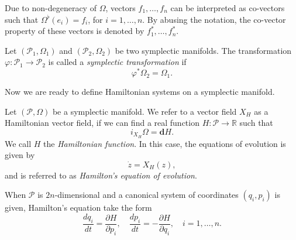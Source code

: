 Due to non-degeneracy of $\Omega$, vectors $f_1,\dots,f_n$ can be interpreted as co-vectors such that $\Omega^{\flat}(e_i)=f_i$, for $i=1,\dots,n$. By abusing the notation, the co-vector property of these vectors is denoted by $f^*_1,\dots,f^*_n$.


\begin{definition}
Let $(\mathcal P_1,\Omega_1)$ and $(\mathcal P_2,\Omega_2)$ be two symplectic manifolds. The transformation $\varphi:\mathcal P_1 \to \mathcal P_2$ is called a \emph{symplectic transformation} if
\begin{equation} \label{eq:2.16}
	\varphi^* \Omega_2 = \Omega_1.
\end{equation}
\end{definition}

Now we are ready to define Hamiltonian systems on a symplectic manifold.

\begin{definition}
Let $(\mathcal P,\Omega)$ be a symplectic manifold. We refer to a vector field $X_H$ as a Hamiltonian vector field, if we can find a real function $H:\mathcal P \to \mathbb R$ such that
\begin{equation} \label{eq:2.17}
	i_{X_H}\Omega = \mathbf d H.
\end{equation}
We call $H$ the \emph{Hamiltonian function}. In this case, the equations of evolution is given by
\begin{equation} \label{eq:2.18}
	\dot z = X_H(z),
\end{equation}
and is referred to as \emph{Hamilton's equation of evolution}.
\end{definition}
\begin{proposition} \cite{marsden2013introduction}
When $\mathcal P$ is $2n$-dimensional and a canonical system of coordinates $(q_i,p_i)$ is given, Hamilton's equation take the form
\begin{equation} \label{eq:2.19}
	\frac{dq_i}{dt} = \frac{\partial H}{\partial p_i}, \quad \frac{dp_i}{dt} = - \frac{\partial H}{\partial q_i}, \quad i=1,\dots,n .
\end{equation}
\end{proposition}

